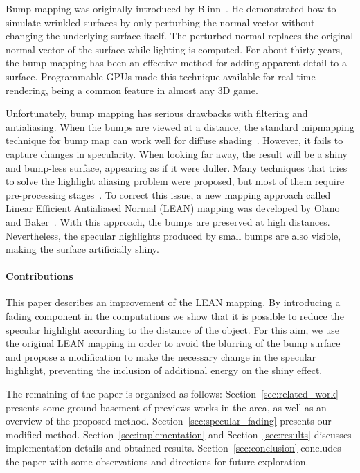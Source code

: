 \documentclass[10pt, conference]{IEEEtran}
\begin{document}
Bump mapping was originally introduced by Blinn~\cite{Blinn:1978:SWS:800248.507101}. He demonstrated how to simulate wrinkled surfaces by only perturbing the normal vector without changing the underlying surface itself. The perturbed normal replaces the original normal vector of the surface while lighting is computed. For about thirty years, the bump mapping has been an effective method for adding apparent detail to a surface. Programmable GPUs made this technique available for real time rendering, being a common feature in almost any 3D game.

Unfortunately, bump mapping has serious drawbacks with filtering and antialiasing. When the bumps are viewed at a distance, the standard mipmapping technique for bump map can work well for diffuse shading~\cite{Kilgard00apractical}. However, it fails to capture changes in specularity. When looking far away, the result will be a shiny and bump-less surface, appearing as if it were duller. Many techniques that tries to solve the highlight aliasing problem were proposed, but most of them require pre-processing stages~\cite{Cabral:1987:BRF:37401.37434, Becker:1993:STB:166117.166141, Westin:1992:PRF:133994.134075}. To correct this issue, a new mapping approach called Linear Efficient Antialiased Normal (LEAN) mapping was developed by Olano and Baker~\cite{Olano:2010:LM:1730804.1730834}. With this approach, the bumps are preserved at high distances. Nevertheless, the specular highlights produced by small bumps are also visible, making the surface artificially shiny.


\paragraph*{Contributions}
%
This paper describes an improvement of the LEAN mapping. By introducing a fading component in the computations we show that it is possible to reduce the specular highlight according to the distance of the object. For this aim, we use the original LEAN mapping in order to avoid the blurring of the bump surface and propose a modification to make the necessary change in the specular highlight, preventing the inclusion of additional energy on the shiny effect.

The remaining of the paper is organized as follows: Section~\ref{sec:related_work} presents some ground basement of previews works in the area, as well as an overview of the proposed method. Section~\ref{sec:specular_fading} presents our modified method. Section~\ref{sec:implementation} and Section~\ref{sec:results} discusses implementation details and obtained results. Section~\ref{sec:conclusion} concludes the paper with some observations and directions for future exploration.
\end{document}
